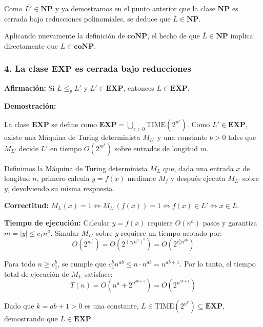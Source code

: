 Como $\overline{L'} \in \mathbf{NP}$ y ya demostramos en el punto anterior que la clase $\mathbf{NP}$ es cerrada bajo reducciones polinomiales, se deduce que $\overline{L} \in \mathbf{NP}$.

Aplicando nuevamente la definición de $\mathbf{coNP}$, el hecho de que $\overline{L} \in \mathbf{NP}$ implica directamente que \textbf{$L \in \mathbf{coNP}$}. 

\subsubsection*{4. La clase $\mathbf{EXP}$ es cerrada bajo reducciones}

\noindent\textbf{Afirmación:} Si $L \le_p L'$ y $L' \in \mathbf{EXP}$, entonces $L \in \mathbf{EXP}$.

\vspace{0.2cm}
\noindent\textbf{Demostración:}

La clase $\mathbf{EXP}$ se define como $\mathbf{EXP} = \bigcup_{c>0} \text{TIME}(2^{n^c})$. Como $L' \in \mathbf{EXP}$, existe una Máquina de Turing determinista $M_{L'}$ y una constante $b > 0$ tales que $M_{L'}$ decide $L'$ en tiempo $O(2^{m^b})$ sobre entradas de longitud $m$.

Definimos la Máquina de Turing determinista $M_L$ que, dada una entrada $x$ de longitud $n$, primero calcula $y = f(x)$ mediante $M_f$ y después ejecuta $M_{L'}$ sobre $y$, devolviendo su misma respuesta.

\vspace{0.2cm}
\noindent\textbf{Correctitud:} $M_L(x) = 1 \iff M_{L'}(f(x)) = 1 \iff f(x) \in L' \iff x \in L$.

\vspace{0.2cm}
\noindent\textbf{Tiempo de ejecución:} Calcular $y = f(x)$ requiere $O(n^a)$ pasos y garantiza $m = |y| \le c_1 n^a$. Simular $M_{L'}$ sobre $y$ requiere un tiempo acotado por:
\[ O\left(2^{m^b}\right) = O\left(2^{(c_1 n^a)^b}\right) = O\left(2^{c_1^b n^{ab}}\right) \]

Para todo $n \ge c_1^b$, se cumple que $c_1^b n^{ab} \le n \cdot n^{ab} = n^{ab + 1}$. Por lo tanto, el tiempo total de ejecución de $M_L$ satisface:
\[ T(n) = O\left(n^a + 2^{n^{ab + 1}}\right) = O\left(2^{n^{ab + 1}}\right) \]

Dado que $k = ab + 1 > 0$ es una constante, $L \in \text{TIME}(2^{n^k}) \subseteq \mathbf{EXP}$, demostrando que \textbf{$L \in \mathbf{EXP}$}. 
